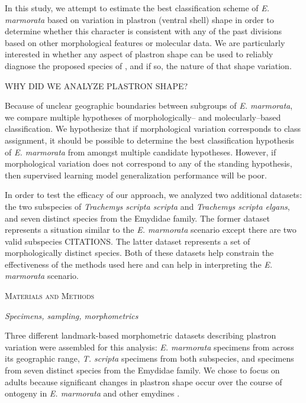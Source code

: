 \documentclass[12pt,letterpaper]{article}
\renewcommand{\section}[1]{%
\bigskip
\begin{center}
\begin{Large}
\normalfont\scshape #1
\medskip
\end{Large}
\end{center}}
\renewcommand{\subsection}[1]{%
\bigskip
\begin{center}
\begin{large}
\normalfont\itshape #1
\end{large}
\end{center}}
\begin{document}
In this study, we attempt to estimate the best classification scheme of \textit{E. marmorata} based on variation in plastron (ventral shell) shape in order to determine whether this character is consistent with any of the past divisions based on other morphological features or molecular data. We are particularly interested in whether any aspect of plastron shape can be used to reliably diagnose the proposed species of \citet{Spinks2014}, and if so, the nature of that shape variation.

\uppercase{Why did we analyze plastron shape?}

Because of unclear geographic boundaries between subgroups of \textit{E. marmorata}, we compare multiple hypotheses of morphologically-- and molecularly--based classification. We hypothesize that if morphological variation corresponds to class assignment, it should be possible to determine the best classification hypothesis of \textit{E. marmorata} from amongst multiple candidate hypotheses. However, if morphological variation does not correspond to any of the standing hypothesis, then supervised learning model generalization performance will be poor.

In order to test the efficacy of our approach, we analyzed two additional datasets: the two subspecies of \textit{Trachemys scripta scripta} and \textit{Trachemys scripta elgans}, and seven distinct species from the Emydidae family. The former dataset represents a situation similar to the \textit{E. marmorata} scenario except there are two valid subspecies CITATIONS. The latter dataset represents a set of morphologically distinct species. Both of these datasets help constrain the effectiveness of the methods used here and can help in interpreting the \textit{E. marmorata} scenario.


\section{Materials and Methods}
\subsection{Specimens, sampling, morphometrics}
Three different landmark-based morphometric datasets describing plastron variation were assembled for this analysis: \textit{E. marmorata} specimens from across its geographic range, \textit{T. scripta} specimens from both subspecies, and specimens from seven distinct species from the Emydidae family. We chose to focus on adults because significant changes in plastron shape occur over the course of ontogeny in \textit{E. marmorata} and other emydines \citep{Angielczyk2013a}.
\end{document}

